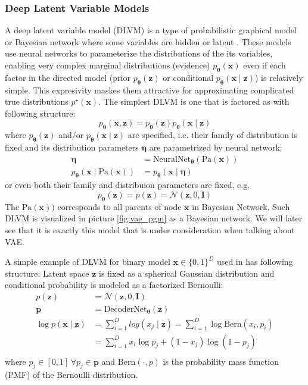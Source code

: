 \subsubsection{Deep Latent Variable Models}
A deep latent variable model (DLVM) is a type of probabilistic graphical model or Bayesian network where some variables are hidden or latent \cite{intro-vae-2019}.
These models use neural networks to parameterize the distributions of the its variables, enabling very complex marginal distributions (evidence)
$p_{\boldsymbol{\theta}}(\mathbf{x})$ even if each factor in the directed model (prior $p_{\boldsymbol{\theta}}(\mathbf{z})$ or conditional $p_{\boldsymbol{\theta}}(\mathbf{x}\mid \mathbf{z})$)
is relatively simple. This expresivity maskes them attractive for approximating complicated true distributions $p^\star(\mathbf{x})$. 
The simplest DLVM is one that is factored as with following structure:
$$
p_{\boldsymbol{\theta}}(\mathbf{x},\mathbf{z}) = p_{\boldsymbol{\theta}}(\mathbf{z})p_{\boldsymbol{\theta}}(\mathbf{x}\mid \mathbf{z})
$$
where $p_{\boldsymbol{\theta}}(\mathbf{z})$ and/or $p_{\boldsymbol{\theta}}(\mathbf{x}\mid \mathbf{z})$ are specified, i.e. their family of distribution is fixed and its distribution
parameters $\boldsymbol{\eta}$ are parametrized by neural network:
\begin{align*}
\boldsymbol{\eta} &= \mathrm{NeuralNet}_{\boldsymbol{\theta}}(\text{Pa}(\mathbf{x})) \\
p_{\boldsymbol{\theta}}(\mathbf{x}\mid \text{Pa}(\mathbf{x})) &= p_{\boldsymbol{\theta}}(\boldsymbol{x}\mid \boldsymbol{\eta})
\end{align*}
or even both their family and distribuion parameters are fixed, e.g. 
$$
p_{\boldsymbol{\theta}}(\mathbf{z}) = p(\mathbf{z}) = \mathcal{N}(\mathbf{z},0,\mathbf{I})
$$
The $\text{Pa}(\mathbf{x}))$ corresponds to all parents of node $\mathbf{x}$ in Bayesian Network.
Such DLVM is visualized in picture \ref{fig:vae_pgm} as a Bayesian network. We will later see that 
it is exactly this model that is under consideration when talking about VAE. 

\begin{example}
    A simple example of DLVM for binary model $\mathbf{x} \in \{0,1\}^{D}$ used in \cite{vae-ssl-dgm-2014} has following structure:
    Latent space $\mathbf{z}$ is fixed as a spherical Gaussian distribution and conditional probability is modeled as
    a factorized Bernoulli:
    \begin{align*}
        p(\mathbf{z}) &= \mathcal{N}(\mathbf{z},0,\mathbf{I})\\
        \mathbf{p} &= \mathrm{DecoderNet}_{\boldsymbol{\theta}}(\mathbf{z}) \\
        \log p(\mathbf{x}\mid \mathbf{z}) &= \sum_{i=1}^D log(x_j \mid  \mathbf{z}) = \sum_{i=1}^D \log \mathrm{Bern}(x_i,p_i)\\
        &= \sum_{i=1}^D x_i \log p_j + (1-x_j) \log(1-p_j)\\
    \end{align*}
    where $p_j \in [0,1]\,\forall p_j \in \mathbf{p}$ and $\mathrm{Bern}(\cdot,p)$ is the probability mass function (PMF)
    of the Bernoulli distribution.
\end{example}

